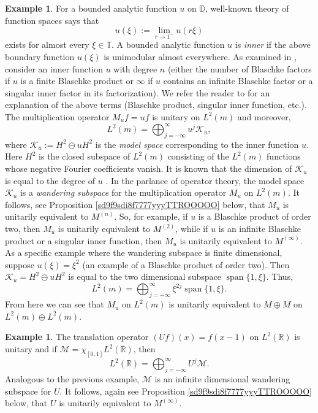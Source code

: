 \documentclass{dis}
\theoremstyle{plain}
\theoremstyle{definition}
\newtheorem{Example}[equation]{Example}
\def\R{\mathbb{R}}
\def\D{\mathbb{D}}
\def\T{\mathbb{T}}
\newcommand{\0}{{\color{lightgray}0}}
\begin{document}
\begin{Example}
For a bounded analytic function $u$ on $\D$, well-known theory of function spaces \cite{Duren} says that 
$$u(\xi) := \lim_{r \to 1^{-}} u(r \xi)$$ exists for almost every $\xi \in \T$. 
A bounded analytic function $u$ is {\em inner} if the above boundary function $u(\xi)$ is unimodular almost everywhere. 
As examined in \cite{MR4866296}, consider an inner function $u$ with degree $n$ (either the number of Blaschke factors if $u$ is a finite Blaschke product or $\infty$ if $u$ contains an infinite Blaschke factor or a singular inner factor in its factorization). We refer the reader to \cite{Duren} for an explanation of the above terms (Blaschke product, singular inner function, etc.). The multiplication operator  $M_{u} f = u f$ is unitary on $L^2(m)$ and moreover, 
$$L^{2}(m) = \bigoplus_{j = -\infty}^{\infty} u^j \mathcal{K}_{u},$$
where $\mathcal{K}_{u} := H^2 \ominus u H^2$ is the {\em model space} corresponding to the inner function $u$.
Here $H^2$ is the closed subspace of $L^2(m)$ consisting of the $L^2(m)$ functions whose negative Fourier coefficients vanish. 
 It is known that the dimension of $\mathcal{K}_{u}$ is equal to the degree of $u$ \cite[p.~117]{MR3526203}.  In the parlance of operator theory, the model space $\mathcal{K}_{u}$ is a {\em wandering subspace} for the multiplication operator $M_u$ on $L^2(m)$. It follows, see Proposition \ref{sd9f9sdi8f7777yyyTTROOOOO} below, that $M_{u}$ is unitarily equivalent to $M^{(n)}$. So, for example, if $u$ is a Blaschke product of order two, then $M_{u}$ is unitarily equivalent to $M^{(2)}$, while if $u$ is an infinite Blaschke product or a singular inner function, 
then $M_{u}$ is unitarily equivalent to $M^{(\infty)}$. As a specific example where the wandering subspace is finite dimensional, suppose $u(\xi) = \xi^2$ (an example of a Blaschke product of order two). Then $\mathcal{K}_{u} = H^2 \ominus u H^2$ is equal to the two dimensional subspace $\operatorname{span}\{1, \xi\}$. Thus, 
$$L^2(m) = \bigoplus_{j = -\infty}^{\infty} \xi^{2j} \operatorname{span}\{1, \xi\}.$$
From here we can see that $M_{u}$ on $L^2(m)$ is unitarily equivalent to $M \oplus M$ on $L^2(m) \oplus L^2(m)$. 
\end{Example}

\begin{Example}
The translation operator $(U f)(x) = f(x - 1)$  on $L^2(\R)$  is unitary and if $\mathcal{M} = \chi_{[0, 1]} L^2(\R)$, then
$$L^2(\R) = \bigoplus_{j = -\infty}^{\infty} U^j \mathcal{M}.$$
Analogous to the previous example, $\mathcal{M}$ is an infinite dimensional wandering subspace for $U$. It follows, again see Proposition \ref{sd9f9sdi8f7777yyyTTROOOOO} below,  that $U$ is unitarily equivalent to $M^{(\infty)}$. 
\end{Example}
\end{document}
